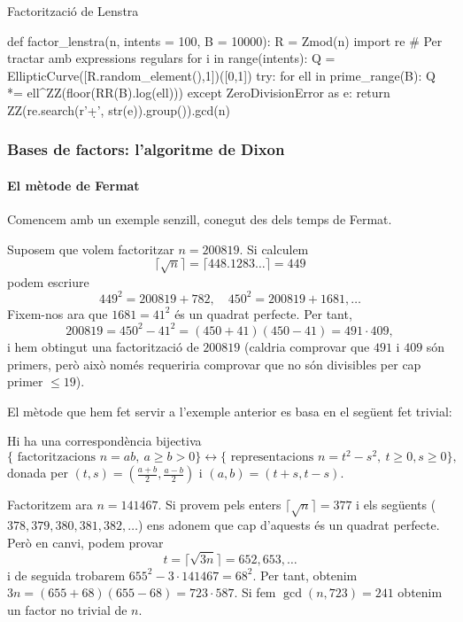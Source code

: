  \begin{algo}
   \caption{Factorització de Lenstra}
 \begin{python}
 def factor_lenstra(n, intents = 100, B = 10000):
    R = Zmod(n)
    import re # Per tractar amb expressions regulars
    for i in range(intents):
        Q = EllipticCurve([R.random_element(),1])([0,1])
        try:
            for ell in prime_range(B):
                Q *= ell^ZZ(floor(RR(B).log(ell)))
        except ZeroDivisionError as e:
            return ZZ(re.search(r'\d+', str(e)).group()).gcd(n)
\end{python}
\end{algo}

 \subsubsection{Bases de factors: l'algoritme de Dixon}
 
 \paragraph{El mètode de Fermat}
 Comencem amb un exemple senzill, conegut des dels temps de Fermat.

 \begin{example}
  
Suposem que volem factoritzar $n=200819$. Si calculem
 \[
 \lceil\sqrt{n}\rceil=\lceil448.1283\ldots\rceil=449
 \]
 podem escriure
 \[
 449^2 = 200819 + 782,\quad 450^2 = 200819 + 1681,\ldots
 \]
 Fixem-nos ara que $1681=41^2$ és un quadrat perfecte. Per tant,
 \[
 200819 = 450^2 - 41^2 = (450+41)(450-41) = 491\cdot 409,
 \]
 i hem obtingut una factorització de $200819$ (caldria comprovar que $491$ i $409$ són primers, però això només requeriria comprovar que no són divisibles per cap primer $\leq 19$).
  \end{example}
 El mètode que hem fet servir a l'exemple anterior es basa en el següent fet trivial:
 \begin{lemma}
Hi ha una correspondència bijectiva
\[
\{\text{ factoritzacions } n=ab,\ a\geq b>0\}\longleftrightarrow \{\text{ representacions } n=t^2-s^2,\ t\geq 0,s\geq 0\},
\]
donada per $(t,s) = (\frac{a+b}{2},\frac{a-b}{2})$ i $(a,b)=(t+s,t-s)$.
 \end{lemma}
 
 \begin{example}
  Factoritzem ara $n=141467$. Si provem pels enters $\lceil\sqrt{n}\rceil = 377$ i els següents ($378, 379, 380, 381, 382,\ldots$) ens adonem que cap d'aquests és un quadrat perfecte. Però en canvi, podem provar
  \[
  t=\lceil\sqrt{3n}\rceil =652, 653,\ldots
  \]
  i de seguida trobarem $655^2 - 3\cdot 141467 = 68^2$.
  Per tant, obtenim $3n = (655+68)(655-68)=723\cdot 587$.
  Si fem $\gcd(n,723)=241$ obtenim un factor no trivial de $n$.
 \end{example}
 
